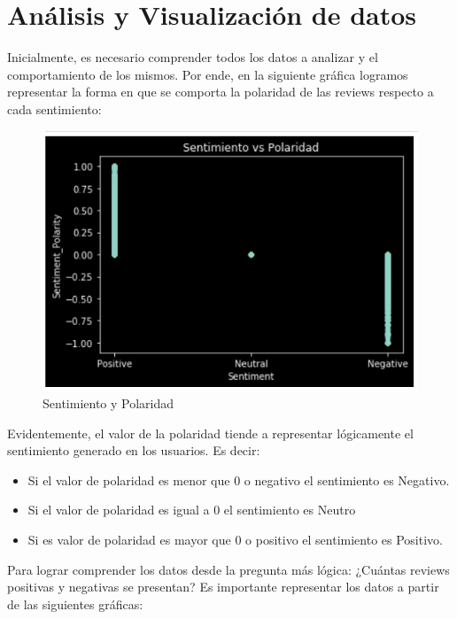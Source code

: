 \documentclass[conference]{IEEEtran}
\begin{document}
\section{Análisis y Visualización de datos}
Inicialmente, es necesario comprender todos los datos a analizar y el comportamiento de los mismos. Por ende, en la siguiente gráfica logramos representar la forma en que se comporta la polaridad de las reviews respecto a cada sentimiento:\\

\begin{figure}[htb]
\centering
\includegraphics[scale=0.4]{Grafica1.jpg}
\caption{Sentimiento y Polaridad}
\end{figure}
Evidentemente, el valor de la polaridad tiende a representar lógicamente el sentimiento generado en los usuarios. Es decir:
\begin{itemize}
\item Si el valor de polaridad es menor que 0 o negativo el sentimiento es Negativo. 
\item Si el valor de polaridad es igual a 0 el sentimiento es Neutro
\item Si es valor de polaridad es mayor que 0 o positivo el sentimiento es Positivo.\\
\end{itemize}

Para lograr comprender los datos desde la pregunta más lógica: ¿Cuántas reviews positivas y negativas se presentan? Es importante representar los datos a partir de las siguientes gráficas:\\
\end{document}
